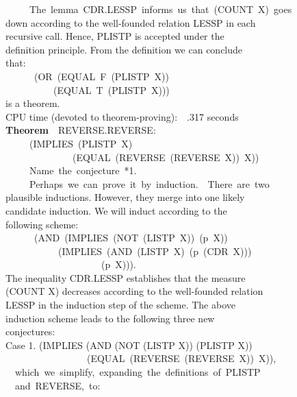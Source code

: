 \documentclass[10pt]{book}
\newenvironment{pubasis}{\begin{flushleft}}{\end{flushleft}}
\newcommand{\axiomordefinition}[1]{\vspace{6pt}\Large\textsf{\textbf{#1}}\normalsize}
\begin{document}
\begin{pubasis}
~~~~~The~lemma~CDR.LESSP~informs~us~that~(COUNT~X)~goes\\
down according to the well-founded relation LESSP in each\\
recursive call.  Hence, PLISTP is accepted under the\\
definition principle.  From the definition we can conclude\\
that:\\
~~~~~~(OR~(EQUAL~F~(PLISTP~X))\\
~~~~~~~~~~(EQUAL~T~(PLISTP~X)))\\
is a theorem.\\

CPU time (devoted to theorem-proving):~~.317 seconds\\

\axiomordefinition{Theorem}~~REVERSE.REVERSE:\\
~~~~~(IMPLIES~(PLISTP~X)\\
~~~~~~~~~~~~~~(EQUAL~(REVERSE~(REVERSE~X))~X))\\

~~~~~Name~the~conjecture~*1.\\

~~~~~Perhaps~we~can~prove~it~by~induction.~~There~are~two\\
plausible inductions.  However, they merge into one likely\\
candidate induction.  We will induct according to the\\
following scheme:\\
~~~~~~(AND~(IMPLIES~(NOT~(LISTP~X))~(p~X))\\
~~~~~~~~~~~(IMPLIES~(AND~(LISTP~X)~(p~(CDR~X)))\\
~~~~~~~~~~~~~~~~~~~~(p~X))).\\
The inequality CDR.LESSP establishes that the measure\\
(COUNT X) decreases according to the well-founded relation\\
LESSP in the induction step of the scheme.  The above\\
induction scheme leads to the following three new\\
conjectures:\\

Case 1.	(IMPLIES (AND (NOT (LISTP X)) (PLISTP X))\\
~~~~~~~~~~~~~~~~~(EQUAL~(REVERSE~(REVERSE~X))~X)),\\

~~which~we~simplify,~expanding~the~definitions~of~PLISTP\\
~~and~REVERSE,~to:\\


\end{pubasis}
\end{document}
